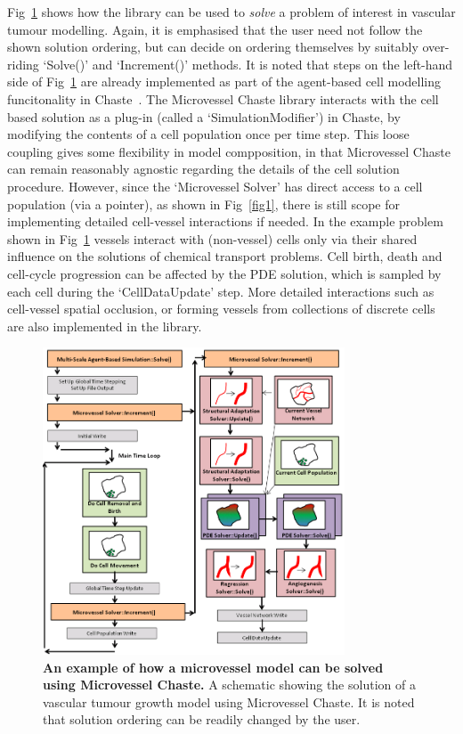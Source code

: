 \documentclass[10pt,letterpaper]{article}
\begin{document}
Fig~\ref{fig2} shows how the library can be used to \emph{solve} a problem of interest in vascular tumour modelling. Again, it is emphasised that the user need not follow the shown solution ordering, but can decide on ordering themselves by suitably over-riding `Solve()' and `Increment()' methods. It is noted that steps on the left-hand side of Fig~\ref{fig2} are already implemented as part of the agent-based cell modelling funcitonality in Chaste~\cite{Mirams2013}. The Microvessel Chaste library interacts with the cell based solution as a plug-in (called a `SimulationModifier') in Chaste, by modifying the contents of a cell population once per time step. This loose coupling gives some flexibility in model compposition, in that Microvessel Chaste can remain reasonably agnostic regarding the details of the cell solution procedure. However, since the `Microvessel Solver' has direct access to a cell population (via a pointer), as shown in Fig~\ref{fig1}, there is still scope for implementing detailed cell-vessel interactions if needed. In the example problem shown in Fig~\ref{fig2} vessels interact with (non-vessel) cells only via their shared influence on the solutions of chemical transport problems. Cell birth, death and cell-cycle progression can be affected by the PDE solution, which is sampled by each cell during the `CellDataUpdate' step. More detailed interactions such as cell-vessel spatial occlusion, or forming vessels from collections of discrete cells are also implemented in the library.

\begin{figure}[!h]
\centering
\includegraphics[width=0.8\textwidth]{Fig2.png}
\caption{{\bf An example of how a microvessel model can be solved using Microvessel Chaste.}
A schematic showing the solution of a vascular tumour growth model using Microvessel Chaste. It is noted that solution ordering can be readily changed by the user.}
\label{fig2}
\end{figure}
\end{document}
